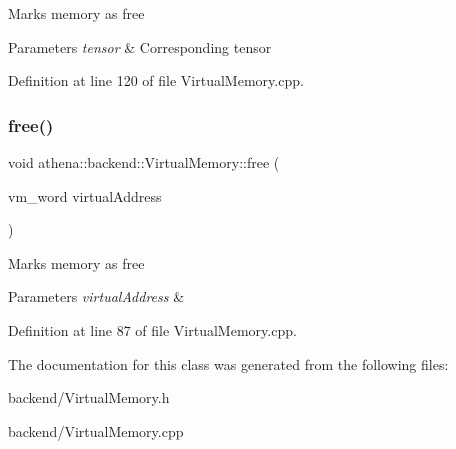 Marks memory as free 
\begin{DoxyParams}{Parameters}
{\em tensor} & Corresponding tensor \\
\hline
\end{DoxyParams}


Definition at line 120 of file Virtual\+Memory.\+cpp.

\mbox{\label{classathena_1_1backend_1_1_virtual_memory_ab24e17b8e8b2f8278b56b84dfdda42a3}} 
\subsubsection{\texorpdfstring{free()}{free()}\hspace{0.1cm}{\footnotesize\ttfamily [2/2]}}
{\footnotesize\ttfamily void athena\+::backend\+::\+Virtual\+Memory\+::free (\begin{DoxyParamCaption}\item[{vm\+\_\+word}]{virtual\+Address }\end{DoxyParamCaption})}

Marks memory as free 
\begin{DoxyParams}{Parameters}
{\em virtual\+Address} & \\
\hline
\end{DoxyParams}


Definition at line 87 of file Virtual\+Memory.\+cpp.



The documentation for this class was generated from the following files\+:\begin{DoxyCompactItemize}
\item 
backend/Virtual\+Memory.\+h\item 
backend/Virtual\+Memory.\+cpp\end{DoxyCompactItemize}
